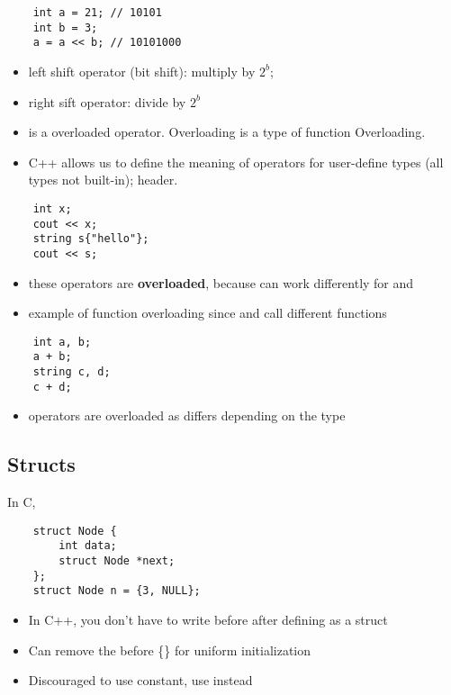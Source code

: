 \begin{lstlisting}
    int a = 21; // 10101
    int b = 3;
    a = a << b; // 10101000
\end{lstlisting}
\begin{itemize}
    \item left shift operator (bit shift): multiply by $ 2^b $;
    \item right sift operator: divide by $ 2^b $
    \item \code{<{}<} is a overloaded operator. Overloading is a type of function
          Overloading.
    \item C++ allows us to define the meaning of operators for user-define types
          (all types not built-in);  \textrightarrow{} 
          header.
\end{itemize}
\begin{lstlisting}
    int x;
    cout << x;
    string s{"hello"};
    cout << s;
\end{lstlisting}
\begin{itemize}
    \item these operators are \textbf{overloaded}, because \code{<{}<} can work
          differently for  and 
    \item example of function overloading since 
          and  call different functions
\end{itemize}
\begin{lstlisting}
    int a, b;
    a + b;
    string c, d;
    c + d;
\end{lstlisting}
\begin{itemize}
    \item operators are overloaded as \code{+} differs depending on the type
\end{itemize}

\subsection{Structs}
In C,
\begin{lstlisting}
    struct Node {
        int data;
        struct Node *next;
    };
    struct Node n = {3, NULL};
\end{lstlisting}
\begin{itemize}
    \item In C++, you don't have to write  before  after defining
           as a struct
    \item Can remove the \code{=} before \{\} for uniform initialization
    \item Discouraged to use  constant, use  instead
\end{itemize}

